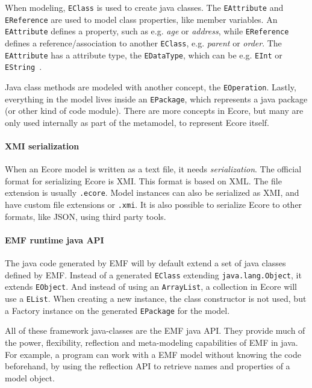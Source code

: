When modeling, \texttt{EClass} is used to create java classes.
The \texttt{EAttribute} and \texttt{EReference} are used to model class properties, like member variables.
An \texttt{EAttribute} defines a property, such as e.g. \textit{age} or \textit{address}, while \texttt{EReference} defines a reference/association to another \texttt{EClass}, e.g. \textit{parent} or \textit{order}.
The \texttt{EAttribute} has a attribute type, the \texttt{EDataType}, which can be e.g. \texttt{EInt} or \texttt{EString}~\cite{edmerksEMFEclipseModeling2009}.

Java class methods are modeled with another concept, the \texttt{EOperation}.
Lastly, everything in the model lives inside an \texttt{EPackage}, which represents a java package (or other kind of code module).
There are more concepts in \gls{Ecore}, but many are only used internally as part of the metamodel, to represent \gls{Ecore} itself.


\paragraph{\Acrshort{XMI} serialization}
When an \gls{Ecore} model is written as a text file, it needs \textit{serialization}.
The official format for serializing Ecore is \acrfull{XMI}.
This format is based on \acrfull{XML}.
The file extension is usually \texttt{.ecore}.
Model instances can also be serialized as \acrshort{XMI}, and have custom file extensions or \texttt{.xmi}.
It is also possible to serialize \gls{Ecore} to other formats, like \gls{JSON}, using third party tools.

\paragraph{\acrshort{EMF} runtime java \acrshort{API}}
The java code generated by \acrshort{EMF} will by default extend a set of java classes defined by \acrshort{EMF}.
Instead of a generated \texttt{EClass} extending \texttt{java.lang.Object}, it extends \texttt{EObject}.
And instead of using an \texttt{ArrayList}, a collection in \gls{Ecore} will use a \texttt{EList}.
When creating a new instance, the class constructor is not used, but a Factory instance on the generated \texttt{EPackage} for the model.


All of these framework java-classes are the \acrshort{EMF} java \gls{API}.
They provide much of the power, flexibility, reflection and meta-modeling capabilities of \acrshort{EMF} in java.
For example, a program can work with a \acrshort{EMF} model without knowing the code beforehand, by using the reflection \acrshort{API} to retrieve names and properties of a model object.


